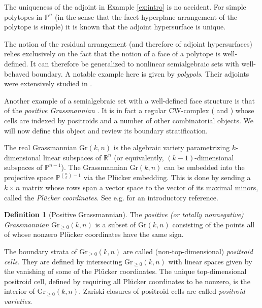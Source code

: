 \documentclass[12pt]{extarticle}
\theoremstyle{definition}
\newtheorem{definition}[theorem]{Definition}
\begin{document}
The uniqueness of the adjoint in Example \ref{ex:intro} is no accident. For simple polytopes in $\mathbb{P}^n$ (in the sense that the facet hyperplane arrangement of the polytope is simple) it is known \cite[Theorem 1]{kohn2020projective} that the adjoint hypersurface is unique.  

The notion of the residual arrangement (and therefore of adjoint hypersurfaces) relies exclusively on the fact that the notion of a face of a polytope is well-defined. It can therefore be generalized to nonlinear semialgebraic sets with well-behaved boundary. A notable example here is given by \emph{polypols}. Their adjoints were extensively studied in \cite{kohn2021adjoints}.

Another example of a semialgebraic set with a well-defined face structure is that of the \emph{positive Grassmannian} \cite{postnikov}. It is in fact a regular CW-complex (\cite[Theorem 3.5]{postnikov} and \cite[Theorem 1.1]{galashin2022regularity}) whose cells are indexed by positroids and a number of other combinatorial objects. We will now define this object and review its boundary stratification. 

The real Grassmannian $\mathrm{Gr}(k,n)$ is the algebraic variety parametrizing $k$-dimensional linear subspaces of $\mathbb{R}^n$ (or equivalently, $(k-1)$-dimensional subspaces of $\mathbb{P}^{n-1}$). The Grassmannian $\mathrm{Gr}(k,n)$ can be embedded into the projective space $\mathbb{P}^{\binom{n}{k}-1}$ via the Pl\"ucker embedding. This is done by sending a $k\times n$ matrix whose rows span a vector space to the vector of its maximal minors, called the \emph{Pl\"ucker coordinates}. See e.g. \cite[Chapter 5]{michalek2021invitation} for an introductory reference. 

\begin{definition}[Positive Grassmannian]
   The \emph{positive (or totally nonnegative) Grassmannian} $\mathrm{Gr}_{\geq 0}(k,n)$ is a subset of $\mathrm{Gr}(k,n)$ consisting of the points all of whose nonzero Pl\"ucker coordinates have the same sign.  
\end{definition}
The boundary strata of $\mathrm{Gr}_{\geq 0}(k,n)$ are called (non-top-dimensional) \emph{positroid cells}. They are defined by intersecting $\mathrm{Gr}_{\geq 0}(k,n)$ with linear spaces given by the vanishing of some of the Pl\"ucker coordinates. The unique top-dimensional positroid cell, defined by requiring all Pl\"ucker coordinates to be nonzero, is the interior of $\mathrm{Gr}_{\geq 0}(k,n)$. Zariski closures of positroid cells are called \emph{positroid varieties}. 
\end{document}
